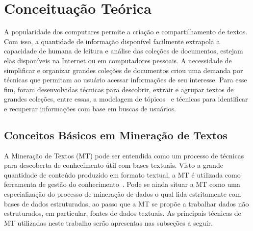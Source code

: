 \chapter{Conceituação Teórica}\label{cap2}


A popularidade dos computares permite a criação e compartilhamento de textos. Com isso, a quantidade de informação disponível facilmente extrapola a capacidade de humana de leitura e análise das coleções de documentos, estejam elas disponíveis na Internet ou em computadores pessoais. A necessidade de simplificar e organizar grandes coleções de documentos criou uma demanda por técnicas que permitam ao usuário acessar informações de seu interesse. Para esse fim, foram desenvolvidas técnicas para descobrir, extrair e agrupar textos de grandes coleções, entre essas, a modelagem de tópicos~\cite{Hofmann1999,Deerwester1990,Lee1999,Blei2012} e técnicas para identificar e recuperar informações com base em buscas de usuários.  











\section{Conceitos Básicos em Mineração de Textos}

A Mineração de Textos (MT) pode ser entendida como um processo de técnicas para descoberta de conhecimento útil com bases textuais. Visto a grande quantidade de conteúdo produzido em formato textual, a MT é utilizada como ferramenta de gestão do conhecimento~\cite{Rezende2011}. Pode se ainda situar a MT como uma especialização do processo de mineração de dados o qual lida estritamente com bases de dados estruturadas, ao passo que a MT se propõe a trabalhar dados não estruturados, em particular, fontes de dados textuais.
As principais técnicas de MT utilizadas neste trabalho serão apresentas nas subseções a seguir.





